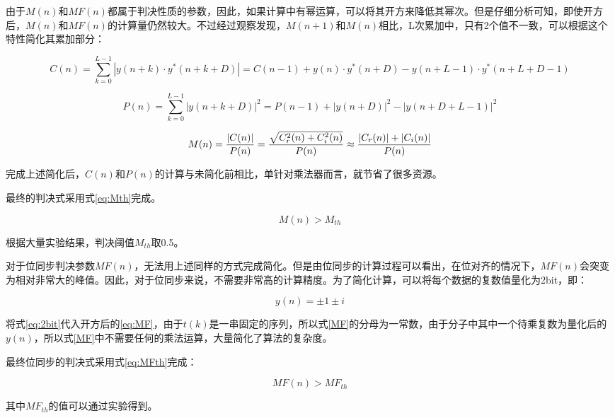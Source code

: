 \documentclass[titlepage]{article}
\numberwithin{figure}{section}
\numberwithin{equation}{section}
\begin{document}
由于$M(n)$和$MF(n)$都属于判决性质的参数，因此，如果计算中有幂运算，可以将其开方来降低其幂次。但是仔细分析可知，即使开方后，$M(n)$和$MF(n)$的计算量仍然较大。不过经过观察发现，$M(n+1)$和$M(n)$相比，L次累加中，只有2个值不一致，可以根据这个特性简化其累加部分：

\begin{equation}\label{eq:C-v01}
C(n)=\sum_{k=0}^{L-1}|y(n+k)\cdot y^{*}(n+k+D)|=C(n-1)+y(n)\cdot y^{*}(n+D)-y(n+L-1)\cdot y^{*}(n+L+D-1)
\end{equation}

\begin{equation}\label{eq:P-v01}
P(n)=\sum_{k=0}^{L-1}{|y(n+k+D)|}^{2}=P(n-1)+{|y(n+D)|}^{2}-{|y(n+D+L-1)|}^{2}
\end{equation}

\begin{equation}\label{eq:M-v01}
M(n)={|C(n)|\over P(n)}={\sqrt{C_{r}^{2}(n)+C_{i}^{2}(n)}\over P(n)} \approx {{|C_{r}(n)|+|C_{i}(n)|} \over P(n)}
\end{equation}

完成上述简化后，$C(n)$和$P(n)$的计算与未简化前相比，单针对乘法器而言，就节省了很多资源。

最终的判决式采用式\ref{eq:Mth}完成。

\begin{equation}\label{eq:Mth}
M(n)>M_{th}
\end{equation}

根据大量实验结果，判决阈值$M_{th}$取0.5。

对于位同步判决参数$MF(n)$，无法用上述同样的方式完成简化。但是由位同步的计算过程可以看出，在位对齐的情况下，$MF(n)$会突变为相对非常大的峰值。因此，对于位同步来说，不需要非常高的计算精度。为了简化计算，可以将每个数据的复数值量化为2bit，即：

\begin{equation}\label{eq:2bit}
y(n)=\pm{1} \pm{i}
\end{equation}

将式\ref{eq:2bit}代入开方后的\ref{eq:MF}，由于$t(k)$是一串固定的序列，所以式\ref{MF}的分母为一常数，由于分子中其中一个待乘复数为量化后的$y(n)$，所以式\ref{MF}中不需要任何的乘法运算，大量简化了算法的复杂度。

最终位同步的判决式采用式\ref{eq:MFth}完成：

\begin{equation}\label{eq:MFth}
MF(n)>MF_{th}
\end{equation}

其中$MF_{th}$的值可以通过实验得到。
\end{document}
